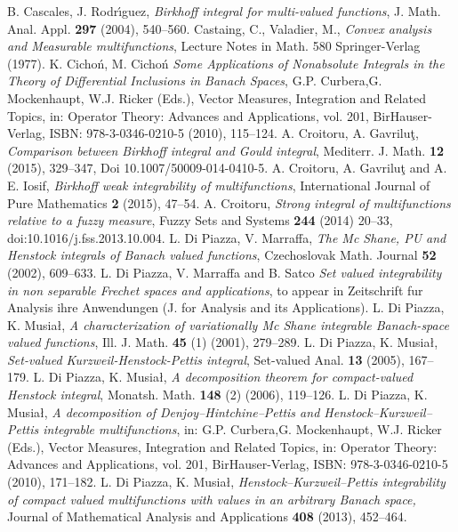 \documentclass[11pt,a4paper,twoside]{amsart}
\begin{document}
\begin{thebibliography}{99}
 B. Cascales, J. Rodr\'{\i}guez,   {\it Birkhoff integral for multi-valued functions},  J. Math. Anal. Appl. {\bf 297} (2004), 540--560.
 Castaing, C., Valadier, M.,  {\it Convex analysis and Measurable multifunctions}, Lecture Notes in Math. 580 Springer-Verlag (1977).
 K. Cicho\'n, M. Cicho\'n   \textit{Some Applications of Nonabsolute Integrals in the Theory of Differential Inclusions in Banach Spaces},
G.P. Curbera,G. Mockenhaupt, W.J. Ricker (Eds.), Vector Measures, Integration and Related Topics, in:
Operator Theory: Advances and Applications,  vol. 201, BirHauser-Verlag, ISBN: 978-3-0346-0210-5 (2010), 115--124.
 A. Croitoru, A. Gavrilu\c{t},  \textit{Comparison between Birkhoff integral and Gould integral}, Mediterr. J. Math. {\bf 12} (2015), 329--347, Doi
10.1007/50009-014-0410-5.
 A. Croitoru, A. Gavrilu\c{t} and A. E.  Iosif,  \textit{Birkhoff weak integrability of multifunctions}, International Journal of Pure Mathematics {\bf 2} (2015), 47--54.
 A. Croitoru,   \textit{Strong integral of multifunctions relative to a fuzzy measure}, 
Fuzzy Sets and Systems {\bf 244} (2014) 20--33, doi:10.1016/j.fss.2013.10.004.
 L. Di Piazza, V. Marraffa,  {\em The Mc Shane, PU and Henstock integrals of Banach valued functions}, Czechoslovak  Math. Journal {\bf 52} (2002), 609--633.
 L. Di Piazza, V. Marraffa and   B. Satco  {\em Set valued integrability in non separable Frechet spaces and applications}, 
to appear in Zeitschrift fur Analysis ihre Anwendungen (J. for Analysis and its Applications).
 L. Di Piazza, K. Musia\l,   \textit{A characterization of variationally Mc Shane integrable Banach-space valued functions}, Ill. J. Math. {\bf 45} (1) (2001), 279--289.
 L. Di Piazza, K. Musia\l,  \textit{ Set-valued Kurzweil-Henstock-Pettis integral}, Set-valued Anal. {\bf 13} (2005), 167--179.
 L. Di Piazza,  K.  Musia\l,  \textit{A decomposition theorem for compact-valued Henstock integral},  Monatsh. Math. \textbf{148} (2) (2006), 119--126.
 L. Di Piazza,  K.  Musia\l,  \textit{A decomposition of Denjoy--Hintchine--Pettis and Henstock--Kurzweil--Pettis integrable multifunctions}, in: G.P. Curbera,G. Mockenhaupt, W.J. Ricker (Eds.), Vector Measures, Integration and Related Topics, in: Operator Theory: Advances and Applications, vol. 201, BirHauser-Verlag, ISBN: 978-3-0346-0210-5 (2010), 171--182.
  L. Di Piazza,  K.  Musia\l,   \textit{Henstock--Kurzweil--Pettis integrability of compact valued multifunctions with values in an arbitrary Banach space,} Journal of Mathematical Analysis and Applications \textbf{408}  (2013), 452--464.

\end{thebibliography}
\end{document}
